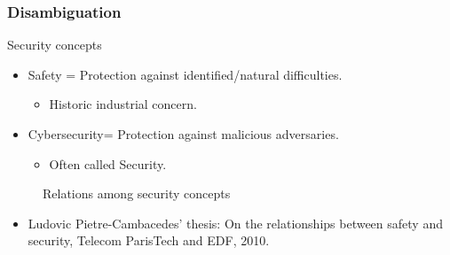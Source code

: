 \documentclass{beamer}
\newcommand{\Cybersec}{Cybersecurity\xspace}
\begin{document}
\begin{frame}
    \frametitle{Disambiguation}
    
    \begin{block}{Security concepts}
        \begin{itemize}
            \item Safety = Protection against identified/natural difficulties.
            \begin{itemize}
                \item Historic industrial concern.
            \end{itemize}
            \item \Cybersec = Protection against malicious adversaries.
            \begin{itemize}
                \item Often called Security.
            \end{itemize}
        \end{itemize}
    \end{block}
    \vfill
    \begin{figure}[htb]
        \resizebox{.85\columnwidth}{!}{
            
        }
        \vspace{-.2cm}
        \caption{Relations among security concepts}
    \end{figure}
    \vspace{-.5cm}
    \begin{itemize}
        \item Ludovic Pietre-Cambacedes' thesis: On the relationships between safety and security, Telecom ParisTech and EDF, 2010.
    \end{itemize}
\end{frame}
\end{document}
